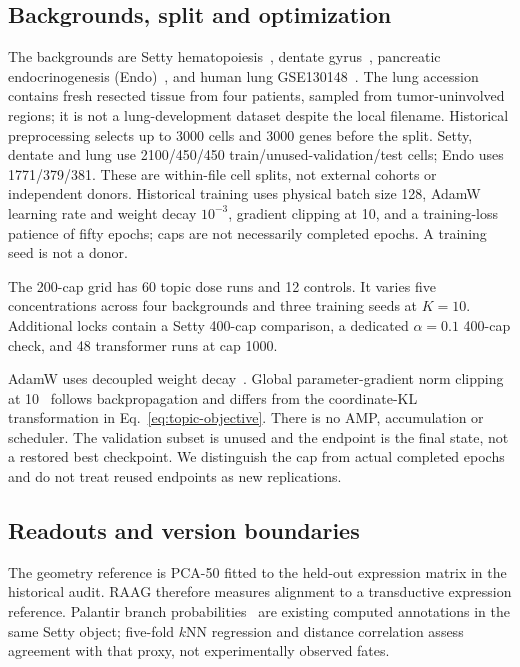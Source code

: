 \documentclass[11pt]{article}
\begin{document}
\subsection{Backgrounds, split and optimization}
The backgrounds are Setty hematopoiesis~\cite{setty2019palantir}, dentate gyrus~\cite{hochgerner2018conserved}, pancreatic endocrinogenesis (Endo)~\cite{bastidas2019endocrinogenesis}, and human lung GSE130148~\cite{vieirabraga2019lung}. The lung accession contains fresh resected tissue from four patients, sampled from tumor-uninvolved regions; it is not a lung-development dataset despite the local filename. Historical preprocessing selects up to 3000 cells and 3000 genes before the split. Setty, dentate and lung use 2100/450/450 train/unused-validation/test cells; Endo uses 1771/379/381. These are within-file cell splits, not external cohorts or independent donors. Historical training uses physical batch size 128, AdamW learning rate and weight decay $10^{-3}$, gradient clipping at 10, and a training-loss patience of fifty epochs; caps are not necessarily completed epochs. A training seed is not a donor.

The 200-cap grid has 60 topic dose runs and 12 controls. It varies five concentrations across four backgrounds and three training seeds at $K=10$. Additional locks contain a Setty 400-cap comparison, a dedicated $\alpha=0.1$ 400-cap check, and 48 transformer runs at cap 1000.

AdamW uses decoupled weight decay~\cite{loshchilov2019decoupled}. Global parameter-gradient norm clipping at 10~\cite{pascanu2013difficulty} follows backpropagation and differs from the coordinate-KL transformation in Eq.~\ref{eq:topic-objective}. There is no AMP, accumulation or scheduler. The validation subset is unused and the endpoint is the final state, not a restored best checkpoint. We distinguish the cap from actual completed epochs and do not treat reused endpoints as new replications.

\subsection{Readouts and version boundaries}
The geometry reference is PCA-50 fitted to the held-out expression matrix in the historical audit. RAAG therefore measures alignment to a transductive expression reference. Palantir branch probabilities~\cite{setty2019palantir} are existing computed annotations in the same Setty object; five-fold $k$NN regression and distance correlation assess agreement with that proxy, not experimentally observed fates.
\end{document}
